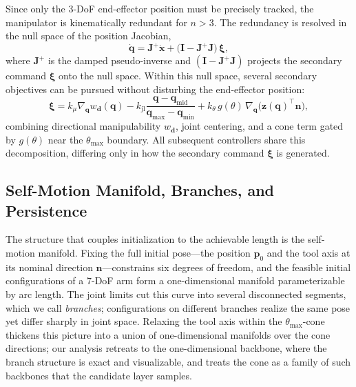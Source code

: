 \documentclass[journal]{IEEEtran}
\begin{document}
Since only the 3-DoF end-effector position must be precisely tracked,
the manipulator is kinematically redundant for $n>3$. The redundancy is
resolved in the null space of the position Jacobian,
\begin{equation}
\dot{\mathbf{q}}=\mathbf{J}^{+}\dot{\mathbf{x}}
+\big(\mathbf{I}-\mathbf{J}^{+}\mathbf{J}\big)\,\boldsymbol{\xi},
\label{eq:nullspace}
\end{equation}
where $\mathbf{J}^{+}$ is the damped pseudo-inverse and
$(\mathbf{I}-\mathbf{J}^{+}\mathbf{J})$ projects the secondary command
$\boldsymbol{\xi}$ onto the null space. Within this null space, several
secondary objectives can be pursued without disturbing the end-effector
position:
\begin{equation}
\boldsymbol{\xi}=k_{\mu}\nabla_{\mathbf{q}}w_{\mathbf{d}}(\mathbf{q})
-k_{\mathrm{jl}}\frac{\mathbf{q}-\mathbf{q}_{\mathrm{mid}}}
{\mathbf{q}_{\max}-\mathbf{q}_{\min}}
+k_{\theta}\,g(\theta)\,
\nabla_{\mathbf{q}}\big(\mathbf{z}(\mathbf{q})^{\!\top}\mathbf{n}\big),
\label{eq:secondary}
\end{equation}
combining directional manipulability $w_{\mathbf{d}}$, joint centering,
and a cone term gated by $g(\theta)$ near the $\theta_{\max}$ boundary.
All subsequent controllers share this decomposition, differing only in
how the secondary command $\boldsymbol{\xi}$ is generated.

\subsection{Self-Motion Manifold, Branches, and Persistence}
\label{sec:smm}
The structure that couples initialization to the achievable length is
the self-motion manifold. Fixing the full initial pose---the position
$\mathbf{p}_{0}$ and the tool axis at its nominal direction
$\mathbf{n}$---constrains six degrees of freedom, and the feasible
initial configurations of a 7-DoF arm form a one-dimensional manifold
parameterizable by arc length. The joint limits cut this curve into
several disconnected segments, which we call \textit{branches};
configurations on different branches realize the same pose yet differ
sharply in joint space. Relaxing the tool axis within the
$\theta_{\max}$-cone thickens this picture into a union of
one-dimensional manifolds over the cone directions; our analysis
retreats to the one-dimensional backbone, where the branch structure is
exact and visualizable, and treats the cone as a family of such
backbones that the candidate layer samples.
\end{document}
